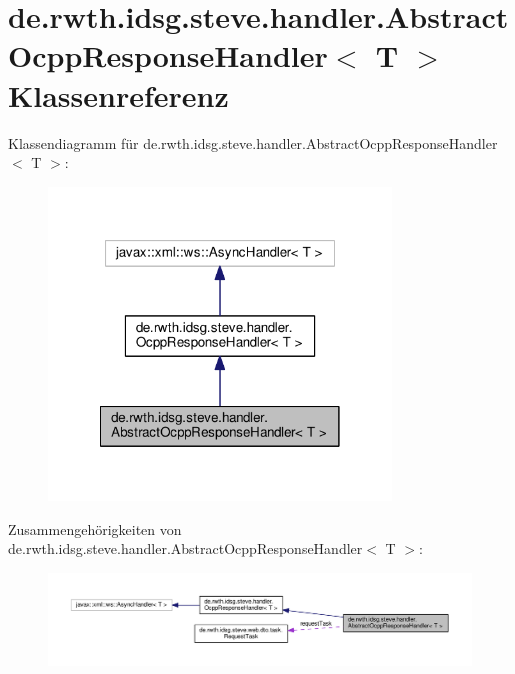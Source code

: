 \hypertarget{classde_1_1rwth_1_1idsg_1_1steve_1_1handler_1_1_abstract_ocpp_response_handler_3_01_t_01_4}{\section{de.\-rwth.\-idsg.\-steve.\-handler.\-Abstract\-Ocpp\-Response\-Handler$<$ T $>$ Klassenreferenz}
\label{classde_1_1rwth_1_1idsg_1_1steve_1_1handler_1_1_abstract_ocpp_response_handler_3_01_t_01_4}
}


Klassendiagramm für de.\-rwth.\-idsg.\-steve.\-handler.\-Abstract\-Ocpp\-Response\-Handler$<$ T $>$\-:\nopagebreak
\begin{figure}[H]
\begin{center}
\leavevmode
\includegraphics[width=258pt]{classde_1_1rwth_1_1idsg_1_1steve_1_1handler_1_1_abstract_ocpp_response_handler_3_01_t_01_4__inherit__graph}
\end{center}
\end{figure}


Zusammengehörigkeiten von de.\-rwth.\-idsg.\-steve.\-handler.\-Abstract\-Ocpp\-Response\-Handler$<$ T $>$\-:\nopagebreak
\begin{figure}[H]
\begin{center}
\leavevmode
\includegraphics[width=350pt]{classde_1_1rwth_1_1idsg_1_1steve_1_1handler_1_1_abstract_ocpp_response_handler_3_01_t_01_4__coll__graph}
\end{center}
\end{figure}
